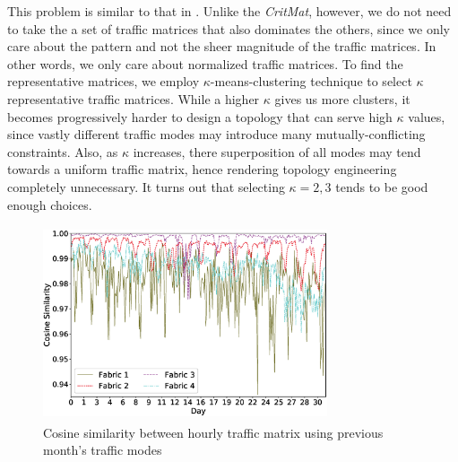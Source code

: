 \documentclass[sigconf]{acmart}
\theoremstyle{definition}
\begin{document}
This problem is similar to that in \cite{zhang2005finding}. Unlike the \textit{CritMat}, however, we do not need to take the a set of traffic matrices that also dominates the others, since we only care about the pattern and not the sheer magnitude of the traffic matrices. In other words, we only care about normalized traffic matrices. To find the representative matrices, we employ $\kappa$-means-clustering technique to select $\kappa$ representative traffic matrices. While a higher $\kappa$ gives us more clusters, it becomes progressively harder to design a topology that can serve high $\kappa$ values, since vastly different traffic modes may introduce many mutually-conflicting constraints. Also, as $\kappa$ increases, there superposition of all modes may tend towards a uniform traffic matrix, hence rendering topology engineering completely unnecessary. It turns out that selecting $\kappa = 2, 3$ tends to be good enough choices.\\

\begin{figure}[t]
    \centering
    \includegraphics[width=3.3in,height=2.25in,trim={0.7cm 1.2cm 0.4cm 0.7cm}]{./figures/cosine_sim.eps}
    \caption{Cosine similarity between hourly traffic matrix using previous month's traffic modes}
    \label{fig:cosine_sim}
\end{figure}

\end{document}
